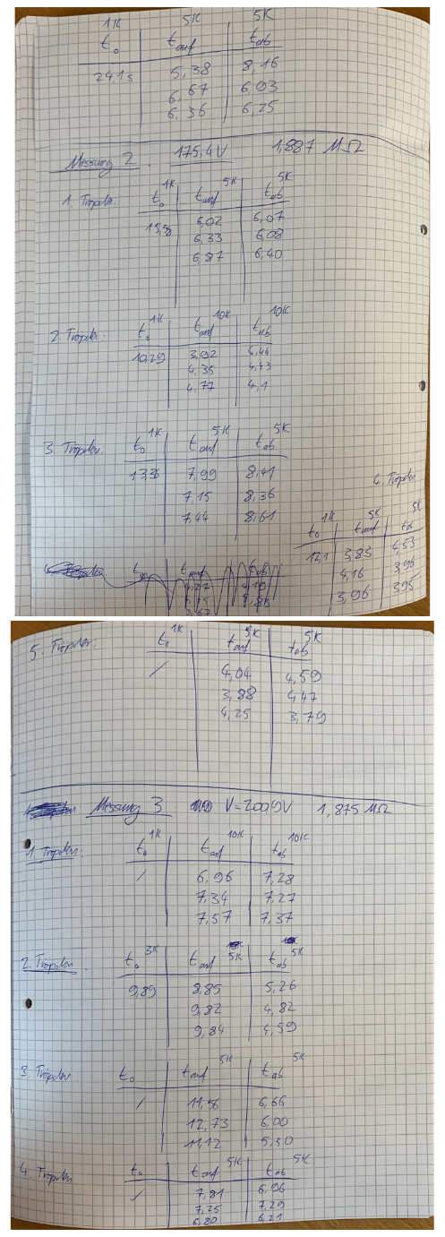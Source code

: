 \includegraphics[height=18cm]{content/pics/originaldaten/Originaldaten_2.pdf}
\newpage
\centering
\includegraphics[height=18cm]{content/pics/originaldaten/Originaldaten_3.pdf}
